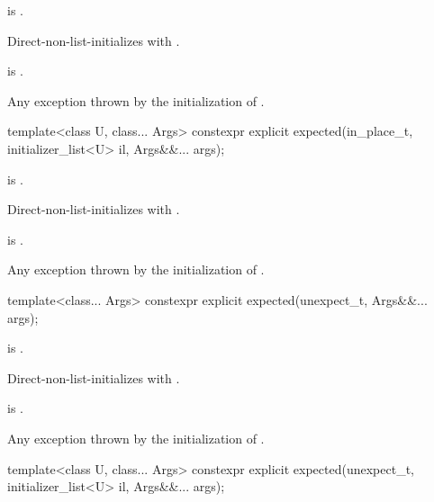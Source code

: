 \begin{itemdescr}
\pnum
\constraints
{} is .

\pnum
\effects
Direct-non-list-initializes  with .

\pnum
\ensures
{} is .

\pnum
\throws
Any exception thrown by the initialization of .
\end{itemdescr}

%
\begin{itemdecl}
template<class U, class... Args>
  constexpr explicit expected(in_place_t, initializer_list<U> il, Args&&... args);
\end{itemdecl}

\begin{itemdescr}
\pnum
\constraints
{} is .

\pnum
\effects
Direct-non-list-initializes  with
.

\pnum
\ensures
{} is .

\pnum
\throws
Any exception thrown by the initialization of .
\end{itemdescr}

%
\begin{itemdecl}
template<class... Args>
  constexpr explicit expected(unexpect_t, Args&&... args);
\end{itemdecl}

\begin{itemdescr}
\pnum
\constraints
{} is .

\pnum
\effects
Direct-non-list-initializes  with
.

\pnum
\ensures
{} is .

\pnum
\throws
Any exception thrown by the initialization of .
\end{itemdescr}

%
\begin{itemdecl}
template<class U, class... Args>
  constexpr explicit expected(unexpect_t, initializer_list<U> il, Args&&... args);
\end{itemdecl}

